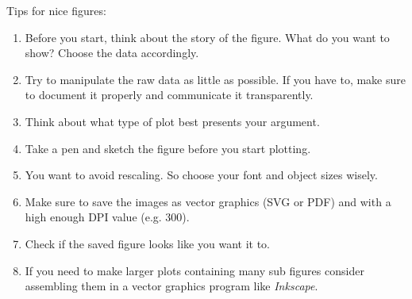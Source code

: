\documentclass{article}
\begin{document}
\hspace{.05\textwidth}\begin{minipage}{.5\textwidth}
\begin{mybox}{Tips for nice figures:}
\begin{enumerate}
    \item Before you start, think about the story of the figure. What do you want to show? Choose the data accordingly.\vspace{-8pt}
    \item Try to manipulate the raw data as little as possible. If you have to, make sure to document it properly and communicate it transparently. \vspace{-8pt}
    \item Think about what type of plot best presents your argument. \vspace{-8pt}
    \item Take a pen and sketch the figure before you start plotting.\vspace{-8pt}
    \item You want to avoid rescaling. So choose your font and object sizes wisely.\vspace{-8pt}
    \item Make sure to save the images as vector graphics (SVG or PDF) and with a high enough DPI value (e.g. 300).\vspace{-8pt}
    \item Check if the saved figure looks like you want it to.\vspace{-8pt}
    \item If you need to make larger plots containing many sub figures consider assembling them in a vector graphics program like \emph{Inkscape}.
\end{enumerate}
    
\end{mybox}

\end{minipage}
\end{document}
